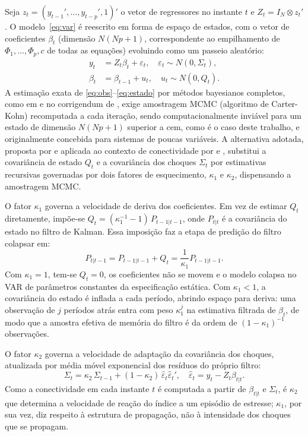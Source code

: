 \documentclass[12pt, a4paper, oneside, english, brazil]{abntex2}
\begin{document}
Seja $z_t = (y_{t-1}', \dots, y_{t-p}', 1)'$ o vetor de regressores no
instante $t$ e $Z_t = I_N \otimes z_t'$. O modelo~\eqref{eq:var} é reescrito
em forma de espaço de estados, com o vetor de coeficientes $\beta_t$
(dimensão $N(Np+1)$, correspondente ao empilhamento de $\Phi_1, \dots,
\Phi_p, c$ de todas as equações) evoluindo como um passeio aleatório:
\begin{align}
    y_t &= Z_t \beta_t + \varepsilon_t, \quad \varepsilon_t \sim N(0, \Sigma_t), \label{eq:obs} \\
    \beta_t &= \beta_{t-1} + u_t, \quad u_t \sim N(0, Q_t). \label{eq:estado}
\end{align}
A estimação exata de \eqref{eq:obs}--\eqref{eq:estado} por métodos bayesianos
completos, como em \textcite{primiceri2005} e no corrigendum de
\textcite{negro2015}, exige amostragem MCMC (algoritmo de Carter-Kohn)
recomputada a cada iteração, sendo computacionalmente inviável para um estado de
dimensão $N(Np+1)$ superior a cem, como é o caso deste trabalho, e originalmente
concebida para sistemas de poucas variáveis. A alternativa adotada, proposta
por \textcite{koop2013} e aplicada ao contexto de conectividade por
\textcite{antonakakis2020} e \textcite{chatziantoniou2021}, substitui a
covariância de estado $Q_t$ e a covariância dos choques $\Sigma_t$ por
estimativas recursivas governadas por dois fatores de esquecimento, $\kappa_1$
e $\kappa_2$, dispensando a amostragem MCMC.

O fator $\kappa_1$ governa a velocidade de deriva dos coeficientes. Em vez de
estimar $Q_t$ diretamente, impõe-se $Q_t = (\kappa_1^{-1} - 1)\, P_{t-1|t-1}$,
onde $P_{t|t}$ é a covariância do estado no filtro de Kalman. Essa imposição
faz a etapa de predição do filtro colapsar em:
\begin{equation}
    P_{t|t-1} = P_{t-1|t-1} + Q_t = \frac{1}{\kappa_1} P_{t-1|t-1}.
    \label{eq:kappa1}
\end{equation}
Com $\kappa_1 = 1$, tem-se $Q_t = 0$, os coeficientes não se movem e o
modelo colapsa no VAR de parâmetros constantes da especificação estática.
Com $\kappa_1 < 1$, a covariância do estado é inflada a cada período,
abrindo espaço para deriva: uma observação de $j$ períodos atrás entra com
peso $\kappa_1^j$ na estimativa filtrada de $\beta_t$, de modo que a amostra
efetiva de memória do filtro é da ordem de $(1-\kappa_1)^{-1}$ observações.

O fator $\kappa_2$ governa a velocidade de adaptação da covariância dos
choques, atualizada por média móvel exponencial dos resíduos do próprio
filtro:
\begin{equation}
    \Sigma_t = \kappa_2\, \Sigma_{t-1} + (1-\kappa_2)\, \hat{\varepsilon}_t \hat{\varepsilon}_t',
    \quad \hat{\varepsilon}_t = y_t - Z_t \beta_{t|t}.
    \label{eq:kappa2}
\end{equation}
Como a conectividade em cada instante $t$ é computada a partir de
$\beta_{t|t}$ e $\Sigma_t$, é $\kappa_2$ que determina a velocidade de reação
do índice a um episódio de estresse; $\kappa_1$, por sua vez, diz respeito à
estrutura de propagação, não à intensidade dos choques que se propagam.
\end{document}
